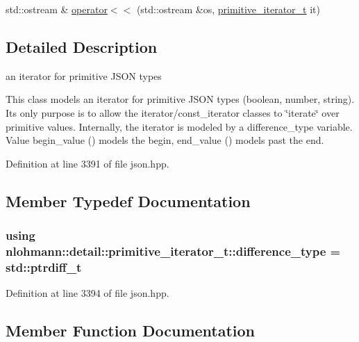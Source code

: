 \begin{DoxyCompactItemize}
\item 
std\+::ostream \& \hyperlink{classnlohmann_1_1detail_1_1primitive__iterator__t_a653e8be3b4fb047e8b4460cd932f2b52}{operator$<$$<$} (std\+::ostream \&os, \hyperlink{classnlohmann_1_1detail_1_1primitive__iterator__t}{primitive\+\_\+iterator\+\_\+t} it)
\end{DoxyCompactItemize}


\subsection{Detailed Description}
an iterator for primitive J\+S\+ON types 

This class models an iterator for primitive J\+S\+ON types (boolean, number, string). It\textquotesingle{}s only purpose is to allow the iterator/const\+\_\+iterator classes to \char`\"{}iterate\char`\"{} over primitive values. Internally, the iterator is modeled by a {\ttfamily difference\+\_\+type} variable. Value begin\+\_\+value ({}) models the begin, end\+\_\+value ({}) models past the end. 

Definition at line 3391 of file json.\+hpp.



\subsection{Member Typedef Documentation}
\subsubsection[{\texorpdfstring{difference\+\_\+type}{difference_type}}]{\setlength{\rightskip}{0pt plus 5cm}using {\bf nlohmann\+::detail\+::primitive\+\_\+iterator\+\_\+t\+::difference\+\_\+type} =  std\+::ptrdiff\+\_\+t}\hypertarget{classnlohmann_1_1detail_1_1primitive__iterator__t_af3db0d5c90de427d51645fe73a015553}{}\label{classnlohmann_1_1detail_1_1primitive__iterator__t_af3db0d5c90de427d51645fe73a015553}


Definition at line 3394 of file json.\+hpp.



\subsection{Member Function Documentation}
